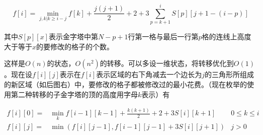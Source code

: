 \documentclass[UTF8]{ctexart}
\theoremstyle{nonumberplain}
\begin{document}
			$$ f[i]=\min_{j,k|k \geq i-j} f[k]+\frac{j(j+1)}{2}+2+3\sum_{p=k+1}^i S[p][j+1-(i-p)] $$
			
			其中$S[p][x]$表示金字塔中第$N-p+1$行第一格与最后一行第$p$格的连线上高度大于等于$x$的要修改的格子的个数。
			
			这样是$O(n)$的状态，$O(n^2)$的转移。可以多设一维状态，将转移优化到$O(1)$。现在设$f[i][j]$表示在$f[i]$表示区域的右下角减去一个边长为$j$的三角形所组成的新区域（如后图右）中，要修改的格子都被修改过的最小花费。（现在枚举的使用第二种转移的子金字塔的顶的高度用字母$k$表示）有
			
			$$ \begin{aligned}
				f[i][0] = & \min_k f[i-1][k-1]+\frac{k(k+1)}{2}+2+3 S[i][k+1] & 0 \leq k \leq i \\
				f[i][j] = & \min(f[i][j-1],f[i-1][j-1]+3 S[i][j+1]) & j>0
			\end{aligned}$$
			
\end{document}
